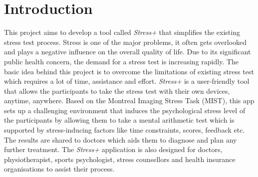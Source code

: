 \section{Introduction}
\label{sec:introduction}

This project aims to develop a tool called \textit{Stress+} that simplifies the existing stress test process. 
Stress is one of the major problems, it often gets overlooked and plays a negative influence on the overall quality of life. 
Due to its significant public health concern, the demand for a stress test is increasing rapidly. 
The basic idea behind this project is to overcome the limitations of existing stress test which requires a lot of time, assistance and effort. 
\textit{Stress+} is a user-friendly tool that allows the participants to take the stress test with their own devices, anytime, anywhere. 
Based on the Montreal Imaging Stress Task (MIST), this app sets up a challenging environment that induces the psychological stress level of the participants by allowing them to take a mental arithmetic test which is supported by stress-inducing factors like time constraints, scores, feedback etc. 
The results are shared to doctors which aids them to diagnose and plan any further treatment.
The \textit{Stress+} application is also designed for doctors, physiotherapist, sports psychologist, stress counsellors and health insurance organisations to assist their process.
